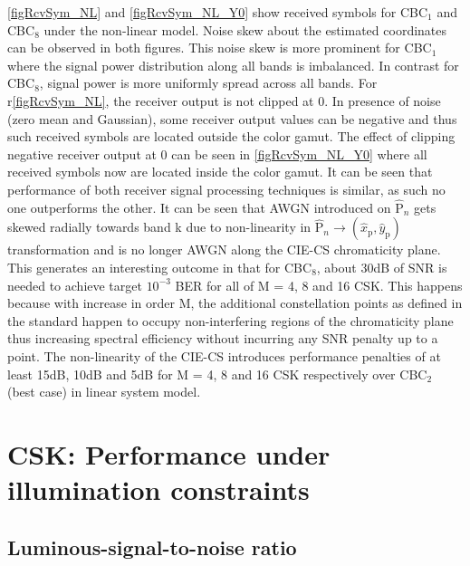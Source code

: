 \documentclass[10pt,letterpaper]{article}
\begin{document}
{\color{red}\figurename\ref{figRcvSym_NL} and \figurename\ref{figRcvSym_NL_Y0} show received symbols for CBC$_{1}$ and CBC$_{8}$ under the non-linear model. Noise skew about the estimated coordinates can be observed in both figures. This noise skew is more prominent for CBC$_{1}$ where the signal power distribution along all bands is imbalanced. In contrast for CBC$_{8}$, signal power is more uniformly spread across all bands. For r\figurename\ref{figRcvSym_NL}, the receiver output is not clipped at 0. In presence of noise (zero mean and Gaussian), some receiver output values can be negative and thus such received symbols are located outside the color gamut. The effect of clipping negative receiver output at 0 can be seen in \figurename\ref{figRcvSym_NL_Y0} where all received symbols now are located inside the color gamut. It can be seen that performance of both receiver signal processing techniques is similar, as such no one outperforms the other.} It can be seen that AWGN introduced on $\hat{\text{P}}_{n}$ gets skewed radially towards band k due to non-linearity in $\hat{\text{P}}_{n}\rightarrow (\hat{x}_{\text{p}},\hat{y}_{\text{p}})$ transformation and is no longer AWGN along the CIE-CS chromaticity plane. This generates an interesting outcome in that for CBC$_{8}$, about 30dB of SNR is needed to achieve target $10^{-3}$ BER for all of M = 4, 8 and 16 CSK. This happens because with increase in order M, the additional constellation points as defined in the standard happen to occupy non-interfering regions of the chromaticity plane thus increasing spectral efficiency without incurring any SNR penalty up to a point. The non-linearity of the CIE-CS introduces performance penalties of at least 15dB, 10dB and 5dB for M = 4, 8 and 16 CSK respectively over CBC$_{2}$ (best case) in linear system model. 

\section{CSK: Performance under illumination constraints}\label{sCSKLSNR}

\subsection{Luminous-signal-to-noise ratio}\label{ssLSNR}
\end{document}
